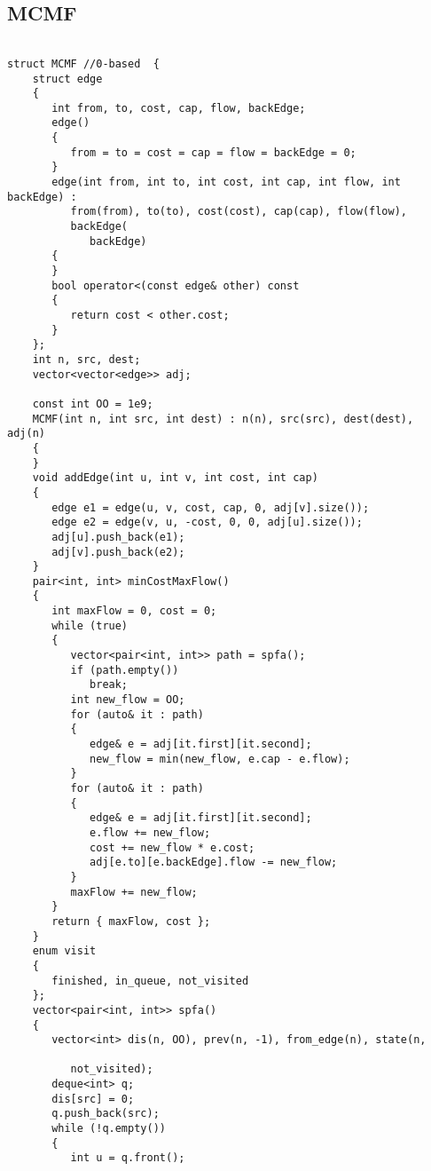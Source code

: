 \subsection{MCMF}

\begin{lstlisting}[style=cpp]
  
struct MCMF //0-based  {  
    struct edge  
    {  
       int from, to, cost, cap, flow, backEdge;  
       edge()  
       {  
          from = to = cost = cap = flow = backEdge = 0;  
       }  
       edge(int from, int to, int cost, int cap, int flow, int backEdge) :  
          from(from), to(to), cost(cost), cap(cap), flow(flow),  
          backEdge(  
             backEdge)  
       {  
       }  
       bool operator<(const edge& other) const  
       {  
          return cost < other.cost;  
       }  
    };  
    int n, src, dest;  
    vector<vector<edge>> adj;  
  
    const int OO = 1e9;  
    MCMF(int n, int src, int dest) : n(n), src(src), dest(dest), adj(n)  
    {  
    }  
    void addEdge(int u, int v, int cost, int cap)  
    {  
       edge e1 = edge(u, v, cost, cap, 0, adj[v].size());  
       edge e2 = edge(v, u, -cost, 0, 0, adj[u].size());  
       adj[u].push_back(e1);  
       adj[v].push_back(e2);  
    }  
    pair<int, int> minCostMaxFlow()  
    {  
       int maxFlow = 0, cost = 0;  
       while (true)  
       {  
          vector<pair<int, int>> path = spfa();  
          if (path.empty())  
             break;  
          int new_flow = OO;  
          for (auto& it : path)  
          {  
             edge& e = adj[it.first][it.second];  
             new_flow = min(new_flow, e.cap - e.flow);  
          }  
          for (auto& it : path)  
          {  
             edge& e = adj[it.first][it.second];  
             e.flow += new_flow;  
             cost += new_flow * e.cost;  
             adj[e.to][e.backEdge].flow -= new_flow;  
          }  
          maxFlow += new_flow;  
       }  
       return { maxFlow, cost };  
    }  
    enum visit  
    {  
       finished, in_queue, not_visited  
    };  
    vector<pair<int, int>> spfa()  
    {  
       vector<int> dis(n, OO), prev(n, -1), from_edge(n), state(n,  
  
          not_visited);  
       deque<int> q;  
       dis[src] = 0;  
       q.push_back(src);  
       while (!q.empty())  
       {  
          int u = q.front();  
  

\end{lstlisting}
